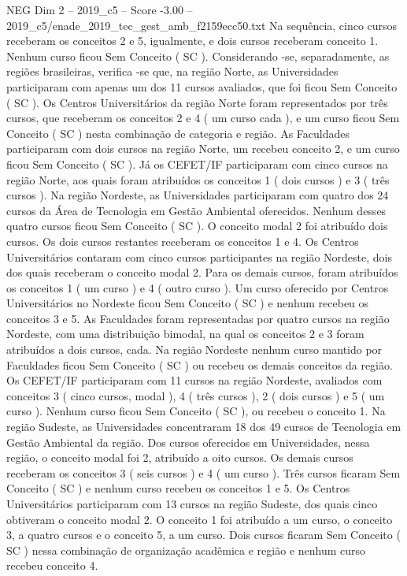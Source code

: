 \begin{textsample}{NEG Dim 2 – 2019\_c5 – Score -3.00 – 2019\_c5/enade\_2019\_tec\_gest\_amb\_f2159ecc50.txt}
Na sequência, cinco cursos receberam os conceitos 2 e 5, igualmente, e dois cursos receberam conceito 1.
Nenhum curso ficou Sem Conceito ( SC ).
Considerando -se, separadamente, as regiões brasileiras, verifica -se que, na região Norte, as Universidades participaram com apenas um dos 11 cursos avaliados, que foi ficou Sem Conceito ( SC ).
Os Centros Universitários da região Norte foram representados por três cursos, que receberam os conceitos 2 e 4 ( um curso cada ), e um curso ficou Sem Conceito ( SC ) nesta combinação de categoria e região.
As Faculdades participaram com dois cursos na região Norte, um recebeu conceito 2, e um curso ficou Sem Conceito ( SC ).
Já os CEFET/IF participaram com cinco cursos na região Norte, aos quais foram atribuídos os conceitos 1 ( dois cursos ) e 3 ( três cursos ).
Na região Nordeste, as Universidades participaram com quatro dos 24 cursos da Área de Tecnologia em Gestão Ambiental oferecidos.
Nenhum desses quatro cursos ficou Sem Conceito ( SC ).
O conceito modal 2 foi atribuído dois cursos.
Os dois cursos restantes receberam os conceitos 1 e 4.
Os Centros Universitários contaram com cinco cursos participantes na região Nordeste, dois dos quais receberam o conceito modal 2.
Para os demais cursos, foram atribuídos os conceitos 1 ( um curso ) e 4 ( outro curso ).
Um curso oferecido por Centros Universitários no Nordeste ficou Sem Conceito ( SC ) e nenhum recebeu os conceitos 3 e 5.
As Faculdades foram representadas por quatro cursos na região Nordeste, com uma distribuição bimodal, na qual os conceitos 2 e 3 foram atribuídos a dois cursos, cada.
Na região Nordeste nenhum curso mantido por Faculdades ficou Sem Conceito ( SC ) ou recebeu os demais conceitos da região.
Os CEFET/IF participaram com 11 cursos na região Nordeste, avaliados com conceitos 3 ( cinco cursos, modal ), 4 ( três cursos ), 2 ( dois cursos ) e 5 ( um curso ).
Nenhum curso ficou Sem Conceito ( SC ), ou recebeu o conceito 1.
Na região Sudeste, as Universidades concentraram 18 dos 49 cursos de Tecnologia em Gestão Ambiental da região.
Dos cursos oferecidos em Universidades, nessa região, o conceito modal foi 2, atribuído a oito cursos.
Os demais cursos receberam os conceitos 3 ( seis cursos ) e 4 ( um curso ).
Três cursos ficaram Sem Conceito ( SC ) e nenhum curso recebeu os conceitos 1 e 5.
Os Centros Universitários participaram com 13 cursos na região Sudeste, dos quais cinco obtiveram o conceito modal 2.
O conceito 1 foi atribuído a um curso, o conceito 3, a quatro cursos e o conceito 5, a um curso.
Dois cursos ficaram Sem Conceito ( SC ) nessa combinação de organização acadêmica e região e nenhum curso recebeu conceito 4.

\end{textsample}

